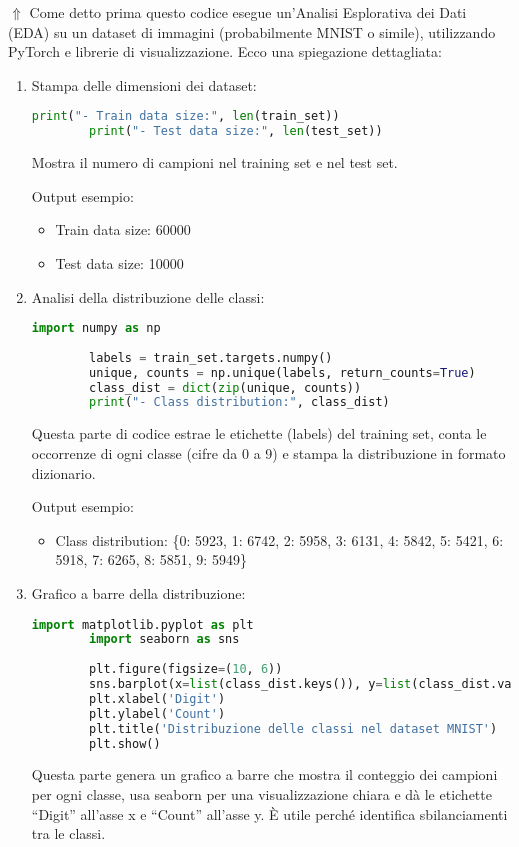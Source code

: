 \documentclass[a4paper,12pt]{article}
\begin{document}
$\Uparrow$ Come detto prima questo codice esegue un'Analisi Esplorativa dei Dati (EDA) su un dataset di immagini (probabilmente MNIST o simile), utilizzando PyTorch e librerie di visualizzazione. Ecco una spiegazione dettagliata:
\begin{enumerate}
    \item Stampa delle dimensioni dei dataset:
    \begin{lstlisting}[language=Python]
        print("- Train data size:", len(train_set))
        print("- Test data size:", len(test_set))
    \end{lstlisting}
    Mostra il numero di campioni nel training set e nel test set. 
    
    Output esempio:
    \begin{itemize}
        \item Train data size: 60000
        \item Test data size: 10000
    \end{itemize}
    
    \item Analisi della distribuzione delle classi:
    \begin{lstlisting}[language=Python, basicstyle=\ttfamily\footnotesize, breaklines=true, frame=single]
        import numpy as np
        
        labels = train_set.targets.numpy()
        unique, counts = np.unique(labels, return_counts=True)
        class_dist = dict(zip(unique, counts))
        print("- Class distribution:", class_dist)
    \end{lstlisting}
    Questa parte di codice estrae le etichette (labels) del training set, conta le occorrenze di ogni classe (cifre da 0 a 9) e stampa la distribuzione in formato dizionario.
    
    Output esempio:
    \begin{itemize}
        \item Class distribution: \{0: 5923, 1: 6742, 2: 5958, 3: 6131, 4: 5842, 5: 5421, 6: 5918, 7: 6265, 8: 5851, 9: 5949\}
    \end{itemize}
    
    \item Grafico a barre della distribuzione:
    \begin{lstlisting}[language=Python, basicstyle=\ttfamily\footnotesize, breaklines=true, frame=single]
        import matplotlib.pyplot as plt
        import seaborn as sns
        
        plt.figure(figsize=(10, 6))
        sns.barplot(x=list(class_dist.keys()), y=list(class_dist.values()))
        plt.xlabel('Digit')
        plt.ylabel('Count')
        plt.title('Distribuzione delle classi nel dataset MNIST')
        plt.show()
    \end{lstlisting}
    Questa parte genera un grafico a barre che mostra il conteggio dei campioni per ogni classe, usa seaborn per una visualizzazione chiara e dà le etichette ``Digit'' all'asse x e ``Count'' all'asse y. È utile perché identifica sbilanciamenti tra le classi.
    

\end{enumerate}
\end{document}
